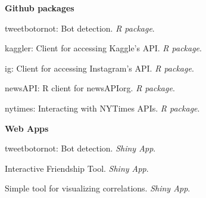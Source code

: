 \begin{innerlist}
\begin{innerlist}
    \end{innerlist}\vspace{1em}

  \textbf{Github packages}
    \begin{innerlist}
      \item tweetbotornot: Bot detection. \textit{R package}. \href{https://github.com/mkearney/tweetbotornot}{\faExternalLink}
      \item kaggler: Client for accessing Kaggle’s API. \textit{R package}. \href{https://github.com/mkearney/kaggler}{\faExternalLink}
      \item ig: Client for accessing Instagram's API. \textit{R package}. \href{https://github.com/mkearney/ig}{\faExternalLink}
      \item newsAPI: R client for newsAPIorg. \textit{R package}. \href{https://github.com/mkearney/newsAPI}{\faExternalLink}
      \item nytimes: Interacting with NYTimes APIs. \textit{R package}. \href{https://github.com/mkearney/nytimes}{\faExternalLink}
    \end{innerlist}\vspace{1em}

  \textbf{Web Apps}
    \begin{innerlist}
      \item tweetbotornot: Bot detection. \textit{Shiny App}. \href{https://mikewk.shinyapps.io/botornot/}{\faExternalLink}
      \item Interactive Friendship Tool. \textit{Shiny App}. \href{https://mikewk.shinyapps.io/friendship/}{\faExternalLink}
      \item Simple tool for visualizing correlations. \textit{Shiny App}. \href{https://mikewk.shinyapps.io/correlation/}{\faExternalLink}
    \end{innerlist}
